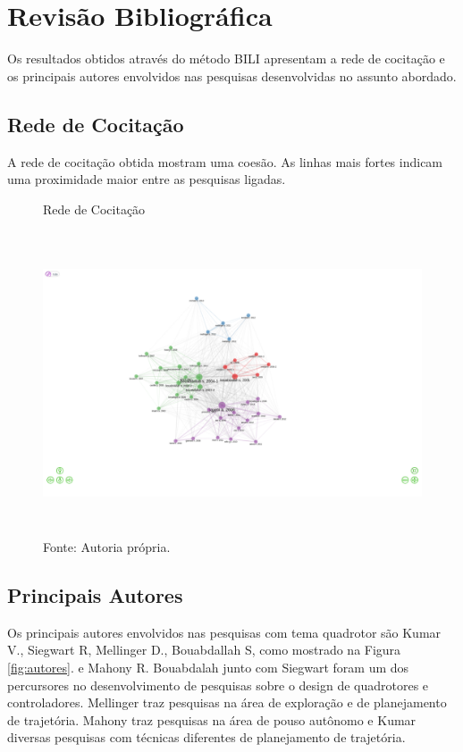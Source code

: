 \section{Revisão Bibliográfica}

Os resultados obtidos através do método BILI apresentam a rede de cocitação e os principais autores envolvidos nas pesquisas desenvolvidas no assunto abordado.

\subsection{Rede de Cocitação}

A rede de cocitação obtida mostram uma coesão. As linhas mais fortes indicam uma proximidade maior entre as pesquisas ligadas. 
\clearpage
\begin{figure} [h!]	
    \centering
    \caption{Rede de Cocitação}
    \includegraphics[width=1\textwidth,trim={3cm 6cm 3cm 
    4cm},clip,height=9cm]{Figures/network.png}
    \caption*{Fonte: Autoria própria.}
    \label{fig:cocitacao}
  \end{figure}

\subsection{Principais Autores}

Os principais autores envolvidos nas pesquisas com tema quadrotor são Kumar V., Siegwart R, Mellinger D., Bouabdallah S, como mostrado na Figura \ref{fig:autores}. e Mahony R. Bouabdalah junto com Siegwart foram um dos percursores no desenvolvimento de pesquisas sobre o design de quadrotores e controladores. Mellinger traz pesquisas na área de exploração e de planejamento de trajetória. Mahony traz pesquisas na área de pouso autônomo e Kumar diversas pesquisas com técnicas diferentes de planejamento de trajetória.

